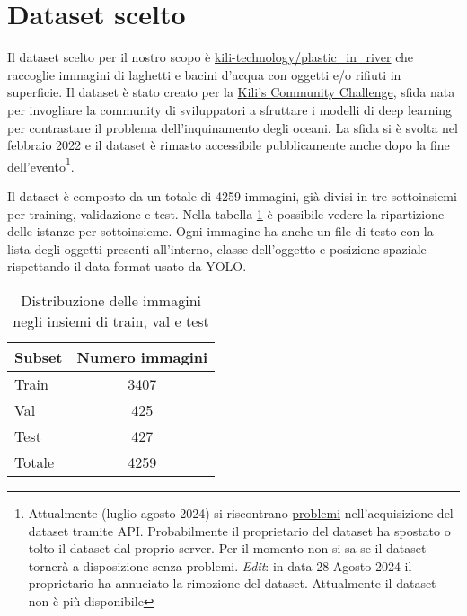 \section{Dataset scelto}

Il dataset scelto per il nostro scopo è \href{https://huggingface.co/datasets/kili-technology/plastic_in_river}{kili-technology/plastic\_in\_river}
che raccoglie immagini di laghetti e bacini d'acqua con oggetti e/o rifiuti in superficie. 
Il dataset è stato creato per la \href{https://kili-technology.com/data-labeling/machine-learning/kili-s-community-challenge-plastic-in-river-dataset}{Kili's Community Challenge},
sfida nata per invogliare la community di sviluppatori a sfruttare i modelli di deep learning per contrastare il problema dell'inquinamento degli oceani. 
La sfida si è svolta nel febbraio 2022 e il dataset è rimasto accessibile pubblicamente anche dopo la fine 
dell'evento\footnote[1]{Attualmente (luglio-agosto 2024) si riscontrano \href{https://huggingface.co/datasets/kili-technology/plastic_in_river/discussions/2}{problemi} nell'acquisizione del dataset tramite API. Probabilmente il proprietario del dataset 
ha spostato o tolto il dataset dal proprio server. Per il momento non si sa se il dataset tornerà a disposizione senza problemi. \textit{Edit}: in data 28 Agosto 2024 il proprietario ha annuciato la 
rimozione del dataset. Attualmente il dataset non è più disponibile}. 

Il dataset è composto da un totale di 4259 immagini, già divisi in tre sottoinsiemi per training, validazione e test. Nella tabella \ref{table:1} 
è possibile vedere la ripartizione delle istanze per sottoinsieme. Ogni immagine ha anche un file di testo con 
la lista degli oggetti presenti all'interno, classe dell'oggetto e posizione spaziale rispettando il data format usato da YOLO.

\begin{table}[h!]
    \centering
    \begin{tabular}{ lc } 
     \hline
     \textbf{Subset} & \textbf{Numero immagini} \\ 
     \hline
     Train & 3407 \\ 
     Val & 425 \\ 
     Test & 427 \\ 
     \hline
     Totale & 4259 \\
     \hline
    \end{tabular}
    \caption{Distribuzione delle immagini negli insiemi di train, val e test }
\label{table:1}
    \end{table}

